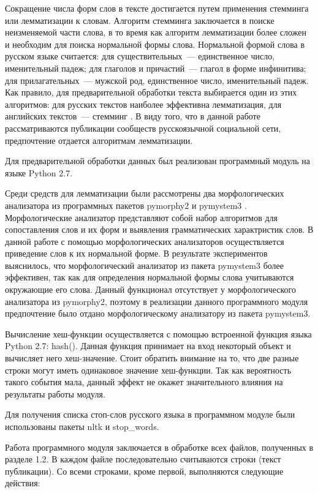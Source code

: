 \documentclass[a4paper]{report}
\begin{document}
	
	Сокращение числа форм слов в тексте достигается путем применения стемминга или лемматизации к словам. Алгоритм стемминга заключается в поиске неизменяемой части слова, в то время как алгоритм лемматизации более сложен и необходим для поиска нормальной формы слова. Нормальной формой слова в русском языке считается: для существительных~--- единственное число, именительный падеж; для глаголов и причастий~--- глагол в форме инфинитива; для прилагательных~--- мужской род, единственное число, именительный падеж. Как правило, для предварительной обработки текста выбирается один из этих алгоритмов: для русских текстов наиболее эффективна лемматизация, для английских текстов~--- стемминг \cite{bib:Voron1}. В виду того, что в данной работе рассматриваются публикации сообществ русскоязычной социальной сети, предпочтение отдается алгоритмам лемматизации.
	
	 
	
	Для предварительной обработки данных был реализован программный модуль на языке Python 2.7.
	
	Среди средств для лемматизации были рассмотрены два морфологических анализатора из программных пакетов pymorphy2 \cite{bib:pymorphy2} и pymystem3 \cite{bib:pymystem3}. Морфологические анализатор представляют собой набор алгоритмов для сопоставления слов и их форм и выявления грамматических характристик слов. В данной работе с помощью морфологических анализаторов осуществляется приведение слов к их нормальной форме. В результате экспериментов выяснилось, что морфологический анализатор из пакета pymystem3 более эффективен, так как для определения нормальной формы слова учитываются окружающие его слова. Данный функционал отсутствует у морфологического анализатора из pymorphy2, поэтому в реализации данного программного модуля предпочтение было отдано морфологическому анализатору из пакета pymystem3.
	
	Вычисление хеш-функции осуществляется с помощью встроенной функция языка Python 2.7: hash(). Данная функция принимает на вход некоторый объект и вычисляет него хеш-значение. Стоит обратить внимание на то, что две разные строки могут иметь одинаковое значение хеш-функции. Так как вероятность такого события мала, данный эффект не окажет значительного влияния на результаты работы модуля.
	
	Для получения списка стоп-слов русского языка в программном модуле были использованы пакеты nltk и stop\_words.
	
	Работа программного модуля заключается в обработке всех файлов, полученных в разделе 1.2. В каждом файле последовательно считываются строки (текст публикации). Со всеми строками, кроме первой, выполняются следующие действия:
	
\end{document}
